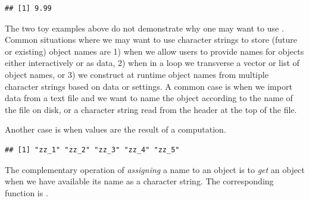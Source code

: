 \documentclass[krantz2]{krantz}\usepackage{knitr}%
\begin{document}
\begin{knitrout}\footnotesize
{}\color{fgcolor}\begin{kframe}
\begin{alltt}
 \hlkwb{<-} 
 \hlstd{)}
\end{alltt}
\begin{verbatim}
## [1] 9.99
\end{verbatim}
\end{kframe}
\end{knitrout}

The two toy examples above do not demonstrate why one may want to use . Common situations where we may want to use character strings to store (future or existing) object names are 1) when we allow users to provide names for objects either interactively or as  data, 2) when in a loop we transverse a vector or list of object names, or 3) we construct at runtime object names from multiple character strings based on data or settings. A common case is when we import data from a text file and we want to name the object according to the name of the file on disk, or a character string read from the header at the top of the file.

Another case is when  values are the result of a computation.

\begin{knitrout}\footnotesize
{}\color{fgcolor}\begin{kframe}
\begin{alltt}
   \hlopt{:}\hlstd{) \{}
   \hlstd{(}\hlstd{(}  \hlstd{=} \hlopt{^}\hlstd{)}
\hlstd{\}}
\hlstd{(} \hlstd{=} \hlstd{)}
\end{alltt}
\begin{verbatim}
## [1] "zz_1" "zz_2" "zz_3" "zz_4" "zz_5"
\end{verbatim}
\end{kframe}
\end{knitrout}

The complementary operation of \emph{assigning} a name to an object is to \emph{get} an object when we have available its name as a character string. The corresponding function is .
\end{document}
